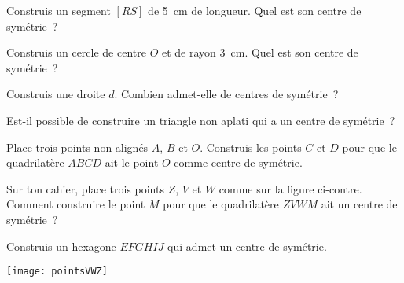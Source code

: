 \begin{activite}

\begin{partie}
Construis un segment $[RS]$ de 5 cm de longueur. Quel est son centre de symétrie ?
\end{partie}


\begin{partie}
Construis un cercle de centre $O$ et de rayon 3 cm. Quel est son centre de symétrie ?
\end{partie}
         
         
\begin{partie}
Construis une droite $d$. Combien admet-elle de centres de symétrie ?
\end{partie}
         
         
\begin{partie}
Est-il possible de construire un triangle non aplati qui a un centre de symétrie ?
\end{partie}
         
         
\begin{partie}
Place trois points non alignés $A$, $B$ et $O$. Construis les points $C$ et $D$ pour que le quadrilatère $ABCD$ ait le point $O$ comme centre de symétrie.
\end{partie}
        
         
\begin{minipage}[c]{0.62\linewidth}
\begin{partie}
Sur ton cahier, place trois points $Z$, $V$ et $W$ comme sur la figure ci-contre. Comment construire le point $M$ pour que le quadrilatère $ZVWM$ ait un centre de symétrie ?
\end{partie}         
              
         
\begin{partie}
Construis un hexagone $EFGHIJ$ qui admet un centre de symétrie.
\end{partie}
 \end{minipage}
  \qquad \begin{minipage}[c]{0.36\linewidth}
  \texttt{[image: pointsVWZ]}
  \end{minipage} \\

\end{activite}

